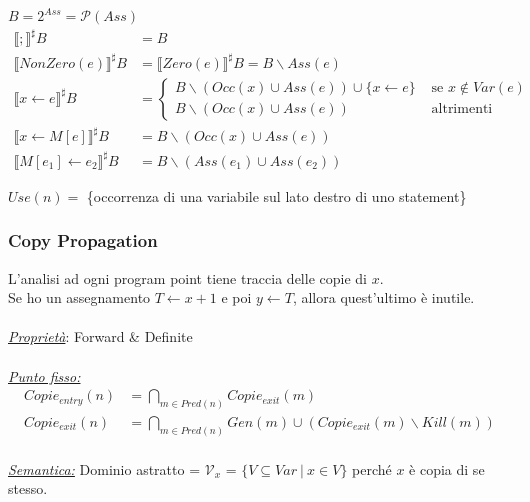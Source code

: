 \documentclass{article}
\begin{document}
                $B = 2^{Ass} = \mathcal{P}(Ass)$
                \begin{align*}
                    \llbracket ; \rrbracket^\sharp B &= B\\
                    \llbracket NonZero(e) \rrbracket^\sharp B &= \llbracket Zero(e) \rrbracket^\sharp B = B \backslash Ass(e)\\
                    \llbracket x\leftarrow e \rrbracket^\sharp B &= \begin{cases}
                        B\backslash (Occ(x) \cup Ass(e)) \cup \{x\leftarrow e \} &\text{ se } x\notin Var(e) \\
                        B\backslash (Occ(x) \cup Ass(e)) &\text{ altrimenti}
                    \end{cases}\\
                    \llbracket x\leftarrow M[e] \rrbracket^\sharp B &= B\backslash (Occ(x) \cup Ass(e))\\
                    \llbracket M[e_1]\leftarrow e_2 \rrbracket^\sharp B &= B\backslash (Ass(e_1) \cup Ass(e_2))
                \end{align*}

                $Use(n) = $ \{occorrenza di una variabile sul lato destro di uno statement\}

            \subsubsection*{Copy Propagation}
                L'analisi ad ogni program point tiene traccia delle copie di $x$.\\
                Se ho un assegnamento $T\leftarrow x+1$ e poi $y\leftarrow T$, allora quest'ultimo è inutile.\\
                \\
                \textit{\underline{Proprietà}}: Forward \& Definite\\
                \\
                \underline{\textit{Punto fisso:}}
                \begin{align*}
                    Copie_{entry}(n) &= \bigcap_{m\in Pred(n)} Copie_{exit}(m)\\
                    Copie_{exit}(n) &= \bigcap_{m\in Pred(n)} Gen(m) \cup (Copie_{exit}(m)\backslash Kill(m))
                \end{align*}
                \\
                \underline{\textit{Semantica:}}
                Dominio astratto = $\mathcal{V}_x$ = $\{V \subseteq Var ~|~ x\in V\}$ perché $x$ è copia di se stesso.
\end{document}
